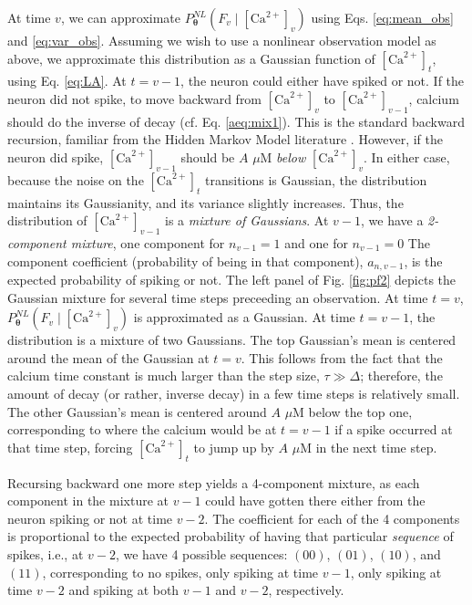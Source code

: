 \documentclass[10pt]{article}
\providecommand{\ve}[1]{\boldsymbol{#1}}
\providecommand{\ve}[1]{\boldsymbol{#1}}
\newcommand{\thetn}{\ve{\theta}}
\newcommand{\p}{P_{\thetn}}
\newcommand{\q}{q\big(\ve{H}_t^{(i)}\big)}
\newcommand{\Ca}{[\text{Ca}^{2+}]}
\begin{document}
At time $v$, we can approximate $\p^{NL}(F_v \mid \Ca_v)$ using Eqs. \ref{eq:mean_obs} and \ref{eq:var_obs}. Assuming we wish to use a nonlinear observation model as above, we approximate this distribution as a Gaussian function of $\Ca_t$, using Eq. \ref{eq:LA}. %
%
At $t=v-1$, the neuron could either have spiked or not. If the neuron did not spike, to move backward from $\Ca_v$ to $\Ca_{v-1}$, calcium should do the inverse of decay (cf. Eq. \ref{aeq:mix1}).  This is the standard backward recursion, familiar from the Hidden Markov Model literature \cite{Rabiner89}.  However, if the neuron did spike, $\Ca_{v-1}$ should be $A$ $\mu$M \emph{below} $\Ca_v$.  In either case, because the noise on the $\Ca_t$ transitions is Gaussian, the distribution maintains its Gaussianity, and its variance slightly increases.  Thus, the distribution of $\Ca_{v-1}$ is a \emph{mixture of Gaussians}.  At $v-1$, we have a \emph{2-component mixture}, one component for $n_{v-1}=1$ and one for $n_{v-1}=0$ The component coefficient (probability of being in that component), $a_{n,v-1}$, is the expected probability of spiking or not. The left panel of Fig. \ref{fig:pf2} depicts the Gaussian mixture for several time steps preceeding an observation.  At time $t=v$, $\p^{NL}(F_v \mid \Ca_v)$ is approximated as a Gaussian. At time $t=v-1$, the distribution is a mixture of two Gaussians. The top Gaussian's mean is centered around the mean of the Gaussian at $t=v$.  This follows from the fact that the calcium time constant is much larger than the step size, $\tau \gg \Delta$; therefore, the amount of decay (or rather, inverse decay) in a few time steps is relatively small. The other Gaussian's mean is centered around $A$ $\mu$M below the top one, corresponding to where the calcium would be at $t=v-1$ if a spike occurred at that time step, forcing $\Ca_t$ to jump up by $A$ $\mu$M in the next time step.  

Recursing backward one more step yields a 4-component mixture, as each component in the mixture at $v-1$ could have gotten there either from the neuron spiking or not at time $v-2$.  The coefficient for each of the 4 components is proportional to the expected probability of having that particular \emph{sequence} of spikes, i.e., at $v-2$, we have 4 possible sequences: $(00)$, $(01)$, $(10)$, and $(11)$, corresponding to no spikes, only spiking at time $v-1$, only spiking at time $v-2$ and spiking at both $v-1$ and $v-2$, respectively.
\end{document}
